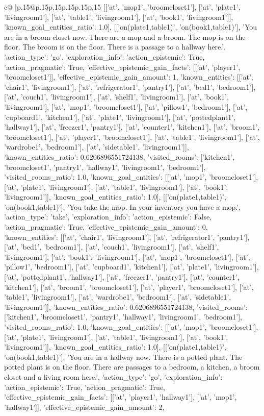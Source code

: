 \documentclass{article}
\begin{document}
{\begin{supertabular}{c@{$\;$}|p{.15\linewidth}@{}p{.15\linewidth}p{.15\linewidth}p{.15\linewidth}p{.15\linewidth}p{.15\linewidth}}
{{{[['at', 'mop1', 'broomcloset1'], ['at', 'plate1', 'livingroom1'], ['at', 'table1', 'livingroom1'], ['at', 'book1', 'livingroom1']], 'known_goal_entities_ratio': 1.0}}], [['on(plate1,table1)', 'on(book1,table1)'], 'You are in a broom closet now. There are a mop and a broom. The mop is on the floor. The broom is on the floor. There is a passage to a hallway here.', {'action_type': 'go', 'exploration_info': {'action_epistemic': True, 'action_pragmatic': True, 'effective_epistemic_gain_facts': [['at', 'player1', 'broomcloset1']], 'effective_epistemic_gain_amount': 1, 'known_entities': [['at', 'chair1', 'livingroom1'], ['at', 'refrigerator1', 'pantry1'], ['at', 'bed1', 'bedroom1'], ['at', 'couch1', 'livingroom1'], ['at', 'shelf1', 'livingroom1'], ['at', 'book1', 'livingroom1'], ['at', 'mop1', 'broomcloset1'], ['at', 'pillow1', 'bedroom1'], ['at', 'cupboard1', 'kitchen1'], ['at', 'plate1', 'livingroom1'], ['at', 'pottedplant1', 'hallway1'], ['at', 'freezer1', 'pantry1'], ['at', 'counter1', 'kitchen1'], ['at', 'broom1', 'broomcloset1'], ['at', 'player1', 'broomcloset1'], ['at', 'table1', 'livingroom1'], ['at', 'wardrobe1', 'bedroom1'], ['at', 'sidetable1', 'livingroom1']], 'known_entities_ratio': 0.6206896551724138, 'visited_rooms': ['kitchen1', 'broomcloset1', 'pantry1', 'hallway1', 'livingroom1', 'bedroom1'], 'visited_rooms_ratio': 1.0, 'known_goal_entities': [['at', 'mop1', 'broomcloset1'], ['at', 'plate1', 'livingroom1'], ['at', 'table1', 'livingroom1'], ['at', 'book1', 'livingroom1']], 'known_goal_entities_ratio': 1.0}}], [['on(plate1,table1)', 'on(book1,table1)'], 'You take the mop. In your inventory you have a mop.', {'action_type': 'take', 'exploration_info': {'action_epistemic': False, 'action_pragmatic': True, 'effective_epistemic_gain_amount': 0, 'known_entities': [['at', 'chair1', 'livingroom1'], ['at', 'refrigerator1', 'pantry1'], ['at', 'bed1', 'bedroom1'], ['at', 'couch1', 'livingroom1'], ['at', 'shelf1', 'livingroom1'], ['at', 'book1', 'livingroom1'], ['at', 'mop1', 'broomcloset1'], ['at', 'pillow1', 'bedroom1'], ['at', 'cupboard1', 'kitchen1'], ['at', 'plate1', 'livingroom1'], ['at', 'pottedplant1', 'hallway1'], ['at', 'freezer1', 'pantry1'], ['at', 'counter1', 'kitchen1'], ['at', 'broom1', 'broomcloset1'], ['at', 'player1', 'broomcloset1'], ['at', 'table1', 'livingroom1'], ['at', 'wardrobe1', 'bedroom1'], ['at', 'sidetable1', 'livingroom1']], 'known_entities_ratio': 0.6206896551724138, 'visited_rooms': ['kitchen1', 'broomcloset1', 'pantry1', 'hallway1', 'livingroom1', 'bedroom1'], 'visited_rooms_ratio': 1.0, 'known_goal_entities': [['at', 'mop1', 'broomcloset1'], ['at', 'plate1', 'livingroom1'], ['at', 'table1', 'livingroom1'], ['at', 'book1', 'livingroom1']], 'known_goal_entities_ratio': 1.0}}], [['on(plate1,table1)', 'on(book1,table1)'], 'You are in a hallway now. There is a potted plant. The potted plant is on the floor. There are passages to a bedroom, a kitchen, a broom closet and a living room here.', {'action_type': 'go', 'exploration_info': {'action_epistemic': True, 'action_pragmatic': True, 'effective_epistemic_gain_facts': [['at', 'player1', 'hallway1'], ['at', 'mop1', 'hallway1']], 'effective_epistemic_gain_amount': 2, }}}
\end{supertabular}}
\end{document}
